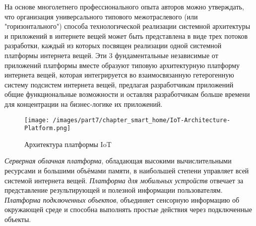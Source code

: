 \begin{SCn}
\end{SCn}

На основе многолетнего профессионального опыта авторов можно утверждать, что организация универсального типового межотраслевого (или "горизонтального") способа технологической реализации системной архитектуры и приложений в интернете вещей может быть представлена в виде трех потоков разработки, каждый из которых посвящен реализации одной системной платформы интернета вещей. Эти 3 фундаментальные независимые от приложений платформы вместе образуют типовую архитектурную платформу интернета вещей, которая интегрируется во взаимосвязанную гетерогенную систему подсистем интернета вещей, предлагая разработчикам приложений общие функциональные возможности  и оставляя разработчикам больше времени для концентрации на бизнес-логике их приложений.

\begin{figure}[H]
	\texttt{[image: /images/part7/chapter\_smart\_home/IoT-Architecture-Platform.png]}
	\caption{Архитектура платформы IoT}
	\label{fig:iot}
\end{figure}

\textit{Серверная облачная платформа}, обладающая высокими вычислительными ресурсами и большими объёмами памяти, в наибольшей степени управляет всей системой интернета вещей. \textit{Платформа для мобильных устройств} отвечает за представление результирующей и полезной информации пользователям. \textit{Платформа подключенных объектов}, объединяет сенсорную информацию об окружающей среде и способна выполнять простые действия через подключенные объекты.

